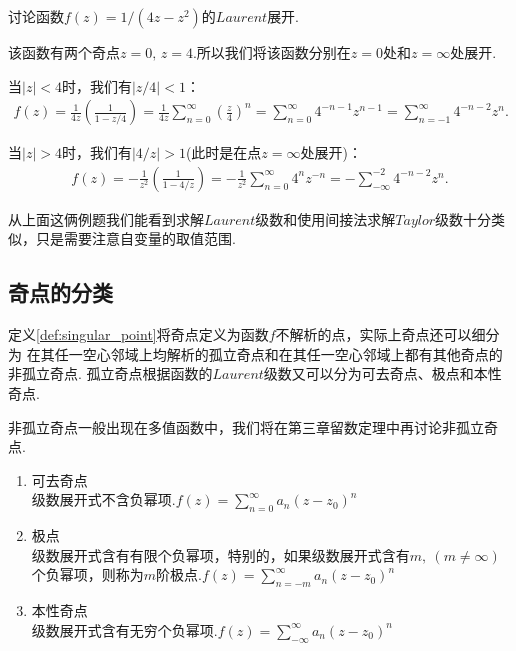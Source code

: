         \begin{example}
            讨论函数$f(z)=1/(4z-z^2)$的$Laurent$展开.
        \end{example}
        \begin{solution}
            该函数有两个奇点$z=0,\,z=4$.所以我们将该函数分别在$z=0$处和$z=\infty$处展开.

            当$|z|<4$时，我们有$|z/4|<1$：
            \begin{align*}
                f(z)=\frac{1}{4z}\left(\frac{1}{1-z/4}\right)=\frac{1}{4z}\sum_{n=0}^{\infty}\left(\frac{z}{4}\right)^n=\sum_{n=0}^{\infty}4^{-n-1}z^{n-1}=\sum_{n=-1}^{\infty}4^{-n-2}z^n.
            \end{align*}

            当$|z|>4$时，我们有$|4/z|>1$(此时是在点$z=\infty$处展开)：
            \begin{align*}
                f(z)=-\frac{1}{z^2}\left(\frac{1}{1-4/z}\right)=-\frac{1}{z^2}\sum_{n=0}^{\infty}4^nz^{-n}=-\sum_{-\infty}^{-2}4^{-n-2}z^{n}.
            \end{align*}
        \end{solution}

        从上面这俩例题我们能看到求解$Laurent$级数和使用间接法求解$Taylor$级数十分类似，只是需要注意自变量的取值范围.

    \subsection{奇点的分类}
        定义\ref{def:singular_point}将奇点定义为函数$f$不解析的点，实际上奇点还可以细分为
        在其任一空心邻域上均解析的孤立奇点和在其任一空心邻域上都有其他奇点的非孤立奇点.
        孤立奇点根据函数的$Laurent$级数又可以分为可去奇点、极点和本性奇点.

        \begin{remark}
            非孤立奇点一般出现在多值函数中，我们将在第三章留数定理中再讨论非孤立奇点.
        \end{remark}

        \begin{enumerate}
            \item 可去奇点\\
                级数展开式不含负幂项.$f(z)=\sum_{n=0}^{\infty}a_n(z-z_0)^n$
            \item 极点\\
                级数展开式含有有限个负幂项，特别的，如果级数展开式含有$m,\ (m\neq \infty)$个负幂项，则称为$m$阶极点.$f(z)=\sum_{n=-m}^{\infty}a_n(z-z_0)^n$
            \item 本性奇点\\
                级数展开式含有无穷个负幂项.$f(z)=\sum_{-\infty}^{\infty}a_n(z-z_0)^n$
        \end{enumerate}

